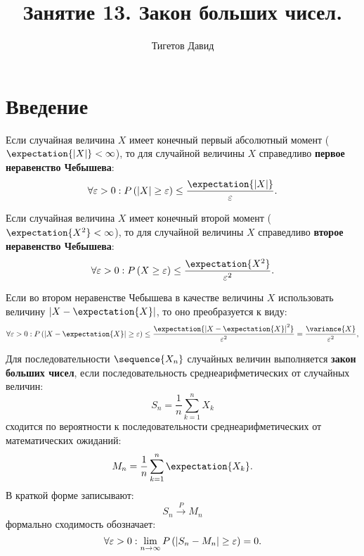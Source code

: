 \documentclass[a4paper,12pt]{article}
\begin{document}
    \title{Занятие 13. Закон больших чисел.}
    \author{Тигетов Давид}
    \maketitle


    \section{Введение}

    Если случайная величина $X$ имеет конечный первый абсолютный момент ($\expectation{\modulus{X}} < \infty$), то для случайной величины $X$ справедливо
    \textbf{первое неравенство Чебышева}:
    \begin{equation}
        \forall \varepsilon > 0 : \probability{ \modulus{X} \ge \varepsilon } \le \frac{\expectation{\modulus{X}}}{\varepsilon} .
    \end{equation}

    Если случайная величина $X$ имеет конечный второй момент ($\expectation{X^2} < \infty$), то для случайной величины $X$ справедливо \textbf{второе неравенство Чебышева}:
    \begin{equation}
        \forall \varepsilon > 0 : \probability{ X \ge \varepsilon } \le \frac{\expectation{X^2}}{\varepsilon^2} .
    \end{equation}

    Если во втором неравенстве Чебышева в качестве величины $X$ использовать величину $\modulus{X - \expectation{X}}$, то оно преобразуется к виду:
    \begin{equation}
        \forall \varepsilon > 0 : \probability{ \modulus{X - \expectation{X}} \ge \varepsilon } \le \frac{\expectation{\modulus{X - \expectation{X}}^2}}{\varepsilon^2} = \frac{\variance{X}}{\varepsilon^2} ,
    \end{equation}

    Для последовательности $\sequence{X_n}$ случайных величин выполняется \textbf{закон больших чисел}, если последовательность среднеарифметических от
    случайных величин:
    \begin{equation}
        S_n = \frac{1}{n} \sum_{k=1}^n X_k
    \end{equation}
    сходится по вероятности к последовательности среднеарифметических от математических ожиданий:
    \begin{equation}
        M_n = \frac{1}{n} \sum_{k=1}^n \expectation{X_k} .
    \end{equation}
    В краткой форме записывают:
    \begin{equation}
        S_n \stackrel{P}{\longrightarrow} M_n
    \end{equation}
    формально сходимость обозначает:
    \begin{equation}
        \forall \varepsilon > 0: \lim_{n \rightarrow \infty} P \left (  \left |  S_n - M_n  \right | \ge \varepsilon  \right ) = 0 .
    \end{equation}
\end{document}
